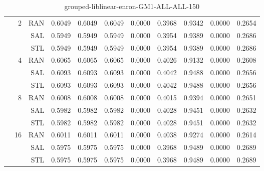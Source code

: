 \begin{center}
\begin{table}[htbp]
\begin{tabular}{ | r | r | r | r | r | r | r | r | r | r | r |}
 & \multirow{3}{*}{2} & RAN & 0.6049 & 0.6049 & 0.6049 & 0.0000 & 0.3968 & 0.9342 & 0.0000 & 0.2654\\ \cline{3-11}
 &   & SAL & 0.5949 & 0.5949 & 0.5949 & 0.0000 & 0.3954 & 0.9389 & 0.0000 & 0.2686\\ \cline{3-11}
 &   & STL & 0.5949 & 0.5949 & 0.5949 & 0.0000 & 0.3954 & 0.9389 & 0.0000 & 0.2686\\ \cline{2-11}
 & \multirow{3}{*}{4} & RAN & 0.6065 & 0.6065 & 0.6065 & 0.0000 & 0.4026 & 0.9132 & 0.0000 & 0.2608\\ \cline{3-11}
 &   & SAL & 0.6093 & 0.6093 & 0.6093 & 0.0000 & 0.4042 & 0.9488 & 0.0000 & 0.2656\\ \cline{3-11}
 &   & STL & 0.6093 & 0.6093 & 0.6093 & 0.0000 & 0.4042 & 0.9488 & 0.0000 & 0.2656\\ \cline{2-11}
 & \multirow{3}{*}{8} & RAN & 0.6008 & 0.6008 & 0.6008 & 0.0000 & 0.4015 & 0.9394 & 0.0000 & 0.2651\\ \cline{3-11}
 &   & SAL & 0.5982 & 0.5982 & 0.5982 & 0.0000 & 0.4028 & 0.9451 & 0.0000 & 0.2632\\ \cline{3-11}
 &   & STL & 0.5982 & 0.5982 & 0.5982 & 0.0000 & 0.4028 & 0.9451 & 0.0000 & 0.2632\\ \cline{2-11}
 & \multirow{3}{*}{16} & RAN & 0.6011 & 0.6011 & 0.6011 & 0.0000 & 0.4038 & 0.9274 & 0.0000 & 0.2614\\ \cline{3-11}
 &   & SAL & 0.5975 & 0.5975 & 0.5975 & 0.0000 & 0.3968 & 0.9489 & 0.0000 & 0.2689\\ \cline{3-11}
 &   & STL & 0.5975 & 0.5975 & 0.5975 & 0.0000 & 0.3968 & 0.9489 & 0.0000 & 0.2689\\ \cline{2-11}
\hline
\end{tabular}
\caption{grouped-liblinear-enron-GM1-ALL-ALL-150}
\end{table}
\end{center}

